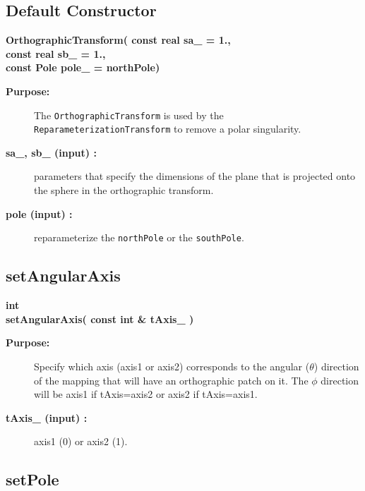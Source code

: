 \subsection{Default Constructor}
 
\newlength{\OrthographicTransformIncludeArgIndent}
\begin{flushleft} \textbf{%
\settowidth{\OrthographicTransformIncludeArgIndent}{OrthographicTransform(}%
OrthographicTransform( const real sa\_    = 1., \\ 
\hspace{\OrthographicTransformIncludeArgIndent}const real sb\_    = 1., \\ 
\hspace{\OrthographicTransformIncludeArgIndent}const Pole pole\_  = northPole)
}\end{flushleft}
\begin{description}
\item[{\bf Purpose:}]  
    The {\tt OrthographicTransform} is used by the {\tt ReparameterizationTransform}
    to remove a polar singularity.
\item[{\bf sa\_, sb\_ (input) :}]  parameters that specify the dimensions of the plane that is projected
   onto the sphere in the orthographic transform.
\item[{\bf pole (input) :}]  reparameterize the {\tt northPole} or the {\tt southPole}. 
\end{description}
\subsection{setAngularAxis}
 
\begin{flushleft} \textbf{%
int  \\ 
\settowidth{\OrthographicTransformIncludeArgIndent}{setAngularAxis(}%
setAngularAxis( const int \& tAxis\_ )
}\end{flushleft}
\begin{description}
\item[{\bf Purpose:}]  
    Specify which axis (axis1 or axis2) corresponds to the angular ($\theta$) direction
   of the mapping that will have an orthographic patch on it. The $\phi$ direction will
   be axis1 if tAxis=axis2 or axis2 if tAxis=axis1.
\item[{\bf tAxis\_ (input) :}]  axis1 (0) or axis2 (1).
\end{description}
\subsection{setPole}
 
